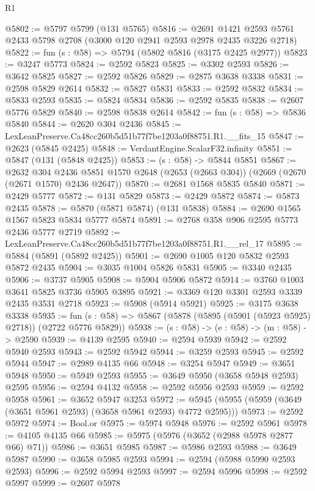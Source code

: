 \begin{lexlean}{R1}
\begin{coremodule}
@5802 := @5797 @5799 (@131 @5765)
@5816 := @2691 @1421 @2593 @5761 @2433 @5798 @2708 (@3000 @120 @2941 @2593 @2978 @2435 @3226 @2718)
@5822 := fun (s : @58) => @5794 (@5802 @5816 (@3175 @2425 @2977))
@5823 := @3247 @5773
@5824 := @2592 @5823
@5825 := @3302 @2593
@5826 := @3642 @5825
@5827 := @2592 @5826
@5829 := @2875 @3638 @3338
@5831 := @2598 @5829 @2614
@5832 := @5827 @5831
@5833 := @2592 @5832
@5834 := @5833 @2593
@5835 := @5824 @5834
@5836 := @2592 @5835
@5838 := @2607 @5776 @5829
@5840 := @2598 @5838 @2614
@5842 := fun (s : @58) => @5836 @5840
@5844 := @2620 @304 @2436
@5845 := LexLeanPreserve.Ca48cc260b5d51b77f7be1203a0f88751.R1.__fits_15
@5847 := @2623 (@5845 @2425)
@5848 := VerdantEngine.ScalarF32.infinity
@5851 := @5847 (@131 (@5848 @2425))
@5853 := (s : @58) -> @5844 @5851
@5867 := @2632
    @304
    @2436
    @5851
    @1570
    @2648
    (@2653 (@2663 @304))
    (@2669 (@2670 (@2671 @1570) @2436 @2647))
@5870 := @2681 @1568 @5835 @5840
@5871 := @2429 @5777
@5872 := @131 @5829
@5873 := @2429 @5872
@5874 := @5873 @2435
@5878 := @5870 (@5871 @5874) (@131 @5838)
@5884 := @2690 @1565 @1567 @5823 @5834 @5777 @5874
@5891 := @2768 @358 @906 @2595 @5773 @2436 @5777 @2719
@5892 := LexLeanPreserve.Ca48cc260b5d51b77f7be1203a0f88751.R1.__rel_17
@5895 := @5884 (@5891 (@5892 @2425))
@5901 := @2690 @1005 @120 @5832 @2593 @5872 @2435
@5904 := @3035 @1004 @5826 @5831
@5905 := @3340 @2435
@5906 := @3737 @5905
@5908 := @5904 @5906 @5872
@5914 := @3760 @1003 @3641 @5825 @3736 @5905 @3895
@5921 := @3369 @120 @3301 @2593 @3339 @2435 @3531 @2718
@5923 := @5908 (@5914 @5921)
@5925 := @3175 @3638 @3338
@5935 := fun (s : @58) => @5867 (@5878 (@5895 (@5901 (@5923 @5925) @2718)) (@2722 @5776 @5829))
@5938 := (s : @58) -> (e : @58) -> (m : @58) -> @2590
@5939 := @4139 @2595
@5940 := @2594 @5939
@5942 := @2592 @5940 @2593
@5943 := @2592 @5942
@5944 := @3259 @2593
@5945 := @2592 @5944
@5947 := @2989 @4135 @66
@5948 := @3254 @5947
@5949 := @3651 @5948
@5950 := @5949 @2593
@5955 := @3649 @5950 (@3658 @5948 @2593) @2595
@5956 := @2594 @4132
@5958 := @2592 @5956 @2593
@5959 := @2592 @5958
@5961 := @3652 @5947 @3253
@5972 := @5945 (@5955 (@5959 (@3649 (@3651 @5961 @2593) (@3658 @5961 @2593) @4772 @2595)))
@5973 := @2592 @5972
@5974 := Bool.or
@5975 := @5974 @5948
@5976 := @2592 @5961
@5978 := @4105 @4135 @66
@5985 := @5975 (@5976 (@3652 (@2988 @5978 @2877 @66) @71))
@5986 := @3651 @5985
@5987 := @5986 @2593
@5988 := @3649 @5987
@5990 := @3658 @5985 @2593
@5994 := @2594 (@5988 @5990 @2593 @2593)
@5996 := @2592 @5994 @2593
@5997 := @2594 @5996
@5998 := @2592 @5997
@5999 := @2607 @5978

\end{coremodule}
\end{lexlean}
